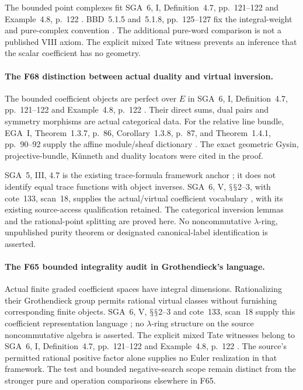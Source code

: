 \documentclass[11pt,a4paper]{article}
\renewcommand{\S}{\ensuremath{\mathsection}}
\newcommand{\fid}[1]{\textsf{#1}}\newcommand{\gate}[1]{\textsf{#1}}
\theoremstyle{named}\newtheorem{finding}{Finding}[section]
\theoremstyle{definition}\newtheorem{definition}[finding]{Definition}
\theoremstyle{remark}\newtheorem{remark}[finding]{Remark}
\begin{document}
The bounded point complexes fit SGA~6, I,
Definition~4.7, pp.~121--122 and
Example~4.8, p.~122 \cite{SGA6}.
BBD~5.1.5 and~5.1.8, pp.~125--127 fix the
integral-weight and pure-complex convention
\cite{BBD}.
The additional pure-word comparison is not
a published VIII axiom. The explicit mixed
Tate witness prevents an inference that
the scalar coefficient has no geometry.

\paragraph{The \fid{F68} distinction between actual duality and virtual inversion.}
The bounded coefficient objects are perfect over \(E\)
in SGA~6, I, Definition~4.7, pp.~121--122 and
Example~4.8, p.~122 \cite{SGA6}.
Their direct sums, dual pairs and symmetry morphisms
are actual categorical data.
For the relative line bundle, EGA~I,
Theorem~1.3.7, p.~86, Corollary~1.3.8, p.~87,
and Theorem~1.4.1, pp.~90--92 supply the
affine module/sheaf dictionary \cite{EGA}.
The exact geometric Gysin, projective-bundle,
K\"unneth and duality locators were cited in the proof.

SGA~5, III, 4.7 is the existing trace-formula
framework anchor \cite{SGA5}; it does not identify
equal trace functions with object inverses.
SGA~6, V, \S\S2--3, with cote~133, scan~18,
supplies the actual/virtual coefficient vocabulary
\cite{SGA6,Archive}, with its existing source-access
qualification retained.
The categorical inversion lemmas and the rational-point
splitting are proved here. No noncommutative
\(\lambda\)-ring, unpublished purity theorem or
designated canonical-label identification is asserted.

\paragraph{The \fid{F65} bounded integrality audit in Grothendieck's language.}
Actual finite graded coefficient spaces have
integral dimensions. Rationalizing their
Grothendieck group permits rational virtual
classes without furnishing corresponding
finite objects.
SGA~6, V, \S\S2--3 and cote~133, scan~18
supply this coefficient representation language
\cite{SGA6,Archive}; no \(\lambda\)-ring structure
on the source noncommutative algebra is asserted.
The explicit mixed Tate witnesses belong to
SGA~6, I, Definition~4.7, pp.~121--122 and
Example~4.8, p.~122 \cite{SGA6}.
The source's permitted rational positive factor
alone supplies no Euler realization in that
framework. The test and bounded negative-search
scope remain distinct from the stronger pure
and operation comparisons elsewhere in \fid{F65}.
\end{document}
